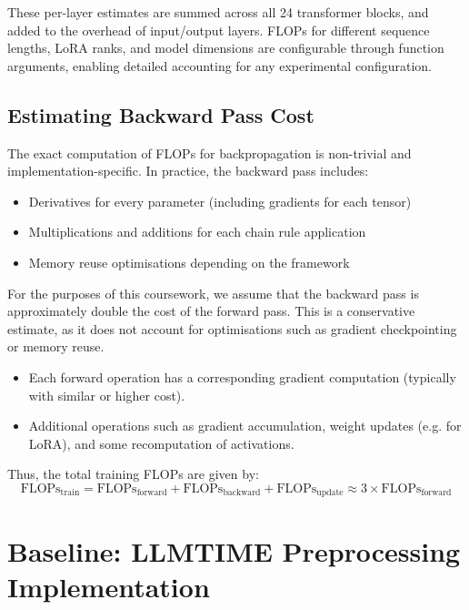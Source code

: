\documentclass[a4paper,12pt]{article}
\begin{document}
These per-layer estimates are summed across all 24 transformer blocks, and added to the overhead of input/output layers. FLOPs for different sequence lengths, LoRA ranks, and model dimensions are configurable through function arguments, enabling detailed accounting for any experimental configuration.

\subsection*{Estimating Backward Pass Cost}

The exact computation of FLOPs for backpropagation is non-trivial and implementation-specific. In practice, the backward pass includes:

\begin{itemize}
  \item Derivatives for every parameter (including gradients for each tensor)
  \item Multiplications and additions for each chain rule application
  \item Memory reuse optimisations depending on the framework
\end{itemize}

For the purposes of this coursework, we assume that the backward pass is approximately double the cost of the forward pass. This is a conservative estimate, as it does not account for optimisations such as gradient checkpointing or memory reuse.

\begin{itemize}
  \item Each forward operation has a corresponding gradient computation (typically with similar or higher cost).
  \item Additional operations such as gradient accumulation, weight updates (e.g. for LoRA), and some recomputation of activations.
\end{itemize}

Thus, the total training FLOPs are given by:
\begin{equation}
\text{FLOPs}_{\text{train}} = \text{FLOPs}_{\text{forward}} + \text{FLOPs}_{\text{backward}} + \text{FLOPs}_{\text{update}} \approx 3 \times \text{FLOPs}_{\text{forward}}
\end{equation}


\section{Baseline: LLMTIME Preprocessing Implementation}
\end{document}
